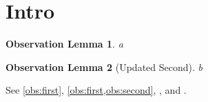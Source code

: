 \documentclass[twocolumn,unicode]{wrapper}
\begin{document}
\wrapperclass\articleclass\layoutmode\hypermode
\newtheorem{oblemma}{Observation Lemma}
\section{Intro}
\begin{oblemma}\label{obs:first}
a
\end{oblemma}
\begin{oblemma}[Updated Second]\label{obs:second}
b
\end{oblemma}
See \autoref{obs:first}, \cref{obs:first,obs:second}, , and .
\end{document}
